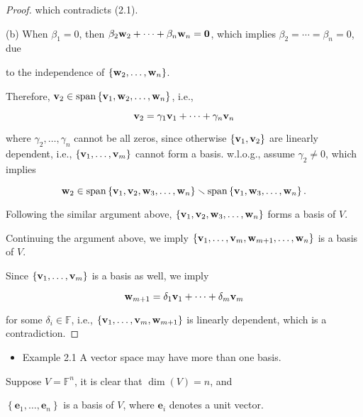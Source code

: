 \documentclass[11pt]{article}
\begin{document}
\begin{proof}
which contradicts (2.1).

(b) When \(\beta_1 = 0\), then \(\beta_2{\bf w}_2 + \cdots  + \beta_n{\bf w}_n = \mathbf{0}\), which implies \(\beta_2 = \cdots  = \beta_n = 0\), due

to the independence of \(\left\{  {{\bf w}_2,\ldots ,{\bf w}_n}\right\}\).

Therefore, \({\bf v}_2 \in  \operatorname{span}\left\{  {{\bf v}_1,{\bf w}_2,\ldots ,{\bf w}_n}\right\}\), i.e.,

\[
{\bf v}_2 = {\gamma }_1{\bf v}_1 + \cdots  + {\gamma }_n{\bf v}_n
\]

where \({\gamma }_2,\ldots ,{\gamma }_n\) cannot be all zeros, since otherwise \(\left\{  {{\bf v}_1,{\bf v}_2}\right\}\) are linearly dependent, i.e., \(\left\{  {{\bf v}_1,\ldots ,{\bf v}_{m}}\right\}\) cannot form a basis. w.l.o.g., assume \({\gamma }_2 \neq  0\), which implies

\[
{\bf w}_2 \in  \operatorname{span}\left\{  {{\bf v}_1,{\bf v}_2,{\bf w}_{3},\ldots ,{\bf w}_n}\right\}   \smallsetminus  \operatorname{span}\left\{  {{\bf v}_1,{\bf w}_{3},\ldots ,{\bf w}_n}\right\}  .
\]

Following the similar argument above, \(\left\{  {{\bf v}_1,{\bf v}_2,{\bf w}_{3},\ldots ,{\bf w}_n}\right\}\) forms a basis of \(V\).

Continuing the argument above, we imply \(\left\{  {{\bf v}_1,\ldots ,{\bf v}_{m},{\bf w}_{m + 1},\ldots ,{\bf w}_n}\right\}\) is a basis of \(V\).

Since \(\left\{  {{\bf v}_1,\ldots ,{\bf v}_{m}}\right\}\) is a basis as well, we imply

\[
{\bf w}_{m + 1} = {\delta }_1{\bf v}_1 + \cdots  + {\delta }_{m}{\bf v}_{m}
\]

for some \({\delta }_{i} \in  \mathbb{F}\), i.e., \(\left\{  {{\bf v}_1,\ldots ,{\bf v}_{m},{\bf w}_{m + 1}}\right\}\) is linearly dependent, which is a contradiction.
\end{proof}


\begin{itemize}
\item Example 2.1 A vector space may have more than one basis.
\end{itemize}

Suppose \(V = {\mathbb{F}}^n\), it is clear that \(\dim \left( V\right)  = n\), and

\(\left\{  {{\mathbf{e}}_1,\ldots ,{\mathbf{e}}_n}\right\}\) is a basis of \(V\), where \({\mathbf{e}}_{i}\) denotes a unit vector.
\end{document}
